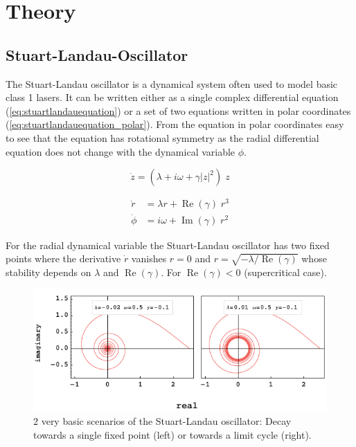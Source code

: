 \section{Theory}
	



	\subsection{Stuart-Landau-Oscillator}
	The Stuart-Landau oscillator is a dynamical system often used to model basic class 1 lasers. It can be written either as a single complex differential equation (\ref{eq:stuartlandauequation}) or a set of two equations written in polar coordinates (\ref{eq:stuartlandauequation_polar}). From the equation in polar coordinates easy to see that the equation has rotational symmetry as the radial differential equation does not change with the dynamical variable $\phi$.
	
	\begin{equation}	
		\dot{z} = (\lambda +  i \omega + \gamma |z|^2 ) \; z
		\label{eq:stuartlandauequation}		
	\end{equation}
	
	\begin{equation}
		\begin{split}
		\dot{r} & = \lambda r + \operatorname{Re} (\gamma) \; r^{3} \\
		\dot{\phi} &= i \omega + \operatorname{Im}(\gamma) \; r^{2} 
		\end{split}
		\label{eq:stuartlandauequation_polar}
	\end{equation}

	For the radial dynamical variable the Stuart-Landau oscillator has two fixed points where the derivative $\dot{r}$ vanishes $r = 0$ and $r = \sqrt{-\lambda /\operatorname{Re}(\gamma)}$ whose stability depends on $\lambda$ and $\operatorname{Re}(\gamma)$. For $\operatorname{Re}(\gamma) < 0 $ (supercritical case).
	

	\begin{figure}
		\centering
		\includegraphics[width=0.99\linewidth]{pics/stuart_landau_complex_Focus_LC}
		\caption{$2$ very basic scenarios of the Stuart-Landau oscillator: Decay towards a single fixed point (left) or towards a limit cycle (right).}
		\label{fig:stuart_spiral}
	\end{figure}



